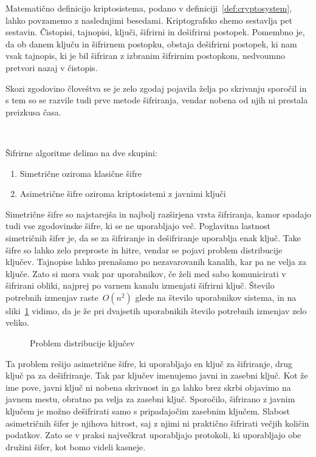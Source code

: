 \documentclass[12pt,a4paper,openany,tikz]{book}
\theoremstyle{plain}
\theoremstyle{definition}
\begin{document}
Matematično definicijo kriptosistema, podano v definiciji~\ref{def:cryptosystem}, lahko povzamemo z naslednjimi besedami. Kriptografsko shemo sestavlja pet sestavin. Čistopisi, tajnopisi, ključi, šifrirni in dešifrirni postopek. Pomembno je, da ob danem ključu in šifrirnem postopku, obstaja dešifrirni postopek, ki nam vsak tajnopis, ki je bil šifriran z izbranim šifrirnim postopkom, nedvoumno pretvori nazaj v čistopis.

Skozi zgodovino človeštva se je zelo zgodaj pojavila želja po skrivanju sporočil in s tem so se razvile tudi prve metode šifriranja, vendar nobena od njih ni prestala preizkusa časa.

\

Šifrirne algoritme delimo na dve skupini:
\begin{enumerate}

	\item Simetrične oziroma klasične šifre
	\item Asimetrične šifre oziroma kriptosistemi z javnimi ključi

\end{enumerate}

Simetrične šifre so najstarejša in najbolj razširjena vrsta šifriranja, kamor spadajo tudi vse zgodovinske šifre, ki se ne uporabljajo več. Poglavitna lastnost simetričnih šifer je, da se za šifriranje in dešifriranje uporablja enak ključ. Take šifre so lahko zelo preproste in hitre, vendar se pojavi problem distribucije ključev. Tajnopise lahko prenašamo po nezavarovanih kanalih, kar pa ne velja za ključe. Zato si mora vsak par uporabnikov, če želi med sabo komunicirati v šifrirani obliki, najprej po varnem kanalu izmenjati šifrirni ključ. Število potrebnih izmenjav raste~$O(n^2)$ glede na število uporabnikov sistema, in na sliki~\ref{fig:symmetricproblem} vidimo, da je že pri dvajsetih uporabnikih število potrebnih izmenjav zelo veliko.

\begin{figure}[ht!]
  \centering
\caption{Problem distribucije ključev}
\label{fig:symmetricproblem}
\end{figure}

Ta problem rešijo asimetrične šifre, ki uporabljajo en ključ za šifriranje, drug ključ pa za dešifriranje. Tak par ključev imenujemo javni in zasebni ključ. Kot že ime pove, javni ključ ni nobena skrivnost in ga lahko brez skrbi objavimo na javnem mestu, obratno pa velja za zasebni ključ. Sporočilo, šifrirano z javnim ključem je možno dešifrirati samo s pripadajočim zasebnim ključem. Slabost asimetričnih šifer je njihova hitrost, saj z njimi ni praktično šifrirati večjih količin podatkov. Zato se v praksi največkrat uporabljajo protokoli, ki uporabljajo obe družini šifer, kot bomo videli kasneje.
\end{document}
